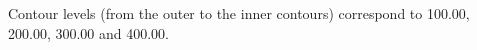 Contour levels (from the outer to the inner contours) correspond to 100.00, 200.00, 300.00 and 400.00.

